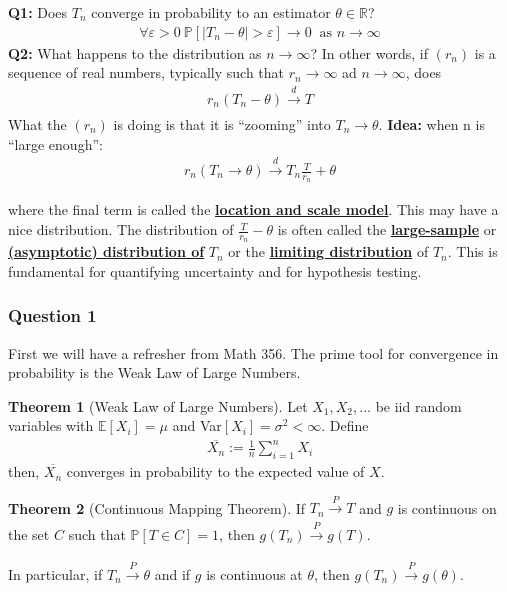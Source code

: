 \documentclass[11pt]{scrartcl}
\newcommand{\R}[0]{\mathbb{R}}
\theoremstyle{definition}
\newtheorem{theorem}{Theorem}
\theoremstyle{remark}
\newcommand{\dfn}[1]{\textbf{\underline{#1}}}
\newcommand{\pr}[1]{\mathbb{P}\left[#1 \right]}
\newcommand{\EX}[1]{\mathbb{E}\left[#1 \right]}
\begin{document}
{\begin{center}
	\textbf{Q1:} Does $T_n$ converge in probability to an estimator $\theta \in \R$? 
	\begin{align}
			\forall \varepsilon > 0\ \pr{ | T_n - \theta | > \varepsilon } \rightarrow 0\ \text{ as } n \rightarrow \infty 
	\end{align} 
	\textbf{Q2:} What happens to the distribution as $n \rightarrow \infty$? In other words, if $(r_n)$ is a sequence of real numbers, typically such that $r_n \rightarrow \infty$ ad $n \rightarrow \infty$, does
	\begin{align} 
			r_n ( T_n - \theta) \xrightarrow[]{d} T
	\end{align}
	What the $(r_n)$ is doing is that it is ``zooming'' into $T_n \rightarrow \theta$.  
	\textbf{Idea:}  when n is ``large enough'': 
	\begin{align*} 
		r_n(T_n \rightarrow \theta) \xrightarrow[]{d} T_n \frac{T}{r_n} + \theta 
	\end{align*}
\end{center}
where the final term is called the \dfn{location and scale model}. This may have a nice distribution. The distribution of $\frac{T}{r_n} - \theta$ is often called the \dfn{large-sample} or \dfn{(asymptotic) distribution of} $T_n$ or the \dfn{limiting distribution} of $T_n$. This is fundamental for quantifying uncertainty and for hypothesis testing. 

\subsubsection{Question 1}

First we will have a refresher from Math 356. The prime tool for convergence in probability is the Weak Law of Large Numbers. 

\begin{theorem}[Weak Law of Large Numbers] 
	Let $X_1, X_2, ...$ be iid random variables with $\EX{X_i} = \mu$ and Var$[X_i] = \sigma^2 < \infty$. Define 
	\begin{align}
		\overline{X_n} :=  \frac{1}{n} \sum_{i=1}^n X_i
	\end{align}
	then, $\overline{X_n}$ converges in probability to the expected value of $X$. 
\end{theorem}

\begin{theorem}[Continuous Mapping Theorem]
	If $T_n \xrightarrow[]{P} T$ and $g$ is continuous on the set $C$ such that $\pr{T \in C} =1$, then $g(T_n) \xrightarrow[]{P} g(T)$. 
\end{theorem}
	In particular, if $T_n \xrightarrow[]{P} \theta$ and if $g$ is continuous at $\theta$, then $g(T_n) \xrightarrow[]{P} g(\theta)$.
	
}
\end{document}
